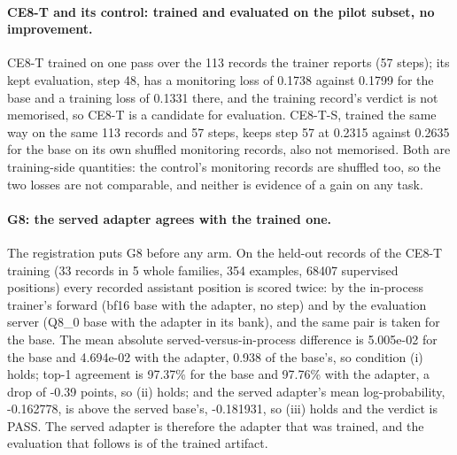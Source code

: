 \paragraph{CE8-T and its control: trained and evaluated on the pilot subset, no improvement.} CE8-T trained on
one pass over the 113 records the trainer reports (57 steps); its kept evaluation, step 48, has a monitoring
loss of 0.1738 against 0.1799 for the base and a training loss of 0.1331 there, and the training record's
verdict is not memorised, so CE8-T is a candidate for evaluation. CE8-T-S, trained the same way on the
same 113 records and 57 steps, keeps step 57 at 0.2315 against 0.2635 for the base on its own shuffled
monitoring records, also not memorised. Both are training-side quantities: the control's monitoring
records are shuffled too, so the two losses are not comparable, and neither is evidence of a gain on any task.

\paragraph{G8: the served adapter agrees with the trained one.} The registration puts G8 before any arm. On the
held-out records of the CE8-T training (33 records in 5 whole families, 354 examples, 68407 supervised
positions) every recorded assistant position is scored twice: by the in-process trainer's forward (bf16 base
with the adapter, no step) and by the evaluation server (Q8\_0 base with the adapter in its bank), and the same
pair is taken for the base. The mean absolute served-versus-in-process difference is 5.005e-02 for the base and
4.694e-02 with the adapter, 0.938 of the base's, so condition (i) holds; top-1 agreement is 97.37\% for the
base and 97.76\% with the adapter, a drop of -0.39 points, so (ii) holds; and the served adapter's mean
log-probability, -0.162778, is above the served base's, -0.181931, so (iii) holds and the verdict is
PASS. The served adapter is therefore the adapter that was trained, and the evaluation that follows is
of the trained artifact.

